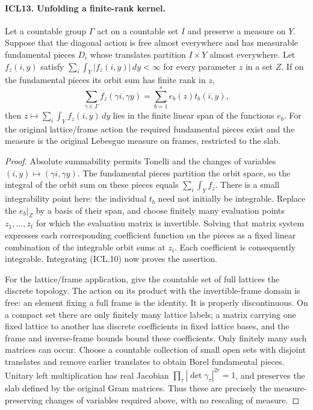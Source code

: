 \documentclass[11pt,a4paper]{article}
\numberwithin{equation}{section}
\theoremstyle{remark}\newtheorem{remark}[theorem]{Remark}
\begin{document}
\paragraph{ICL13. Unfolding a finite-rank kernel.}
\label{claim:ICL13}
Let a countable group \(\Gamma\) act on a countable set
\(I\) and preserve a measure on \(Y\).  Suppose that the
diagonal action is free almost everywhere and has measurable
fundamental pieces \(D_i\) whose translates partition
\(I\times Y\) almost everywhere.  Let
\(f_z(i,y)\) satisfy
\(\sum_i\int_Y|f_z(i,y)|\,dy<\infty\) for every
parameter \(z\) in a set \(Z\).  If on the fundamental
pieces its orbit sum has finite rank in \(z\),
\[
 \sum_{\gamma\in\Gamma}f_z(\gamma i,\gamma y)
              =\sum_{b=1}^s e_b(z)t_b(i,y),            \tag{ICL.10}
\]
then \(z\mapsto\sum_i\int_Y f_z(i,y)\,dy\) lies in
the finite linear span of the functions \(e_b\).
For the original lattice/frame action the required
fundamental pieces exist and the measure is the original
Lebesgue measure on frames, restricted to the slab.
\begin{proof}
Absolute summability permits Tonelli and the changes of
variables \((i,y)\mapsto(\gamma i,\gamma y)\).  The
fundamental pieces partition the orbit space, so the
integral of the orbit sum on these pieces equals
\(\sum_i\int_Y f_z\).  There is a small integrability
point here: the individual \(t_b\) need not initially be
integrable.  Replace the \(e_b|_Z\) by a basis of their
span, and choose finitely many evaluation points
\(z_1,\ldots,z_t\) for which the evaluation matrix is
invertible.  Solving that matrix system expresses each
corresponding coefficient function on the pieces as a
fixed linear combination of the integrable orbit sums
at \(z_i\).  Each coefficient is consequently integrable.
Integrating (ICL.10) now proves the assertion.

For the lattice/frame application, give the countable
set of full lattices the discrete topology.  The action
on its product with the invertible-frame domain is free:
an element fixing a full frame is the identity.  It is
properly discontinuous.  On a compact set there are only
finitely many lattice labels; a matrix carrying one
fixed lattice to another has discrete coefficients in
fixed lattice bases, and the frame and inverse-frame
bounds bound these coefficients.  Only finitely many
such matrices can occur.  Choose a countable collection
of small open sets with disjoint translates and remove
earlier translates to obtain Borel fundamental pieces.
Unitary left multiplication has real Jacobian
\(\prod_\tau|\det\gamma_\tau|^{2r}=1\), and preserves
the slab defined by the original Gram matrices.  Thus
these are precisely the measure-preserving changes of
variables required above, with no rescaling of measure.
\end{proof}
\end{document}
